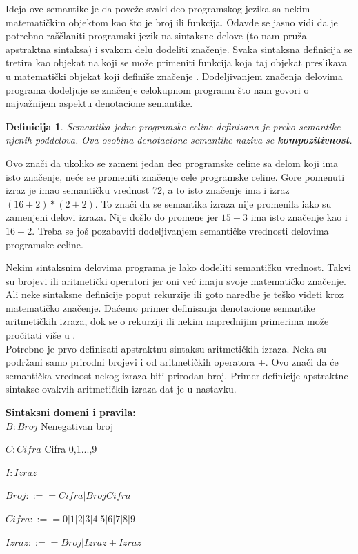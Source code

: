 \documentclass[a4paper]{article}
\newtheorem{definicija}{Definicija}[section]
\begin{document}
Ideja ove semantike je da poveže svaki deo programskog jezika sa nekim matematičkim objektom kao što je broj ili funkcija. Odavde se jasno vidi da je potrebno raščlaniti programski jezik na sintaksne delove (to nam pruža apstraktna sintaksa) i svakom delu dodeliti značenje. Svaka sintaksna definicija se tretira kao objekat na koji se može primeniti funkcija koja taj objekat preslikava u matematički objekat koji definiše značenje \cite{parezanovic}. Dodeljivanjem značenja delovima programa dodeljuje se značenje celokupnom programu što nam govori o najvažnijem aspektu denotacione semantike.
\begin{definicija}
Semantika jedne programske celine definisana je preko semantike njenih poddelova. Ova osobina denotacione semantike naziva se \textbf{kompozitivnost}.
\end{definicija}

Ovo znači da ukoliko se zameni jedan deo programske celine sa delom koji ima isto značenje, neće se promeniti značenje cele programske celine. Gore pomenuti izraz je imao semantičku vrednost 72, a to isto značenje ima i izraz $ (16+2)*(2+2) $. To znači da se semantika izraza nije promenila iako su zamenjeni delovi izraza. Nije došlo do promene jer $ 15+3 $ ima isto značenje kao i $ 16+2 $. Treba se još pozabaviti dodeljivanjem semantičke vrednosti delovima programske celine.

Nekim sintaksnim delovima programa je lako dodeliti semantičku vrednost. Takvi su brojevi ili aritmetički operatori jer oni već imaju svoje matematičko značenje. Ali neke sintaksne definicije poput rekurzije ili goto naredbe je teško videti kroz matematičko značenje. Daćemo primer definisanja denotacione semantike aritmetičkih izraza, dok se o rekurziji ili nekim naprednijim primerima može pročitati više u \cite{nielson}.\\


Potrebno je prvo definisati apstraktnu sintaksu aritmetičkih izraza. Neka su podržani samo prirodni brojevi i od aritmetičkih operatora +. Ovo znači da će semantička vrednost nekog izraza biti prirodan broj. Primer definicije apstraktne sintakse ovakvih aritmetičkih izraza dat je u nastavku.


\begin{tcolorbox}
\textbf{Sintaksni domeni i pravila:}
\\

$B: Broj $  \qquad\qquad Nenegativan broj

$C: Cifra $ \qquad\qquad Cifra 0,1...,9

$I: Izraz $

$ Broj ::== Cifra | Broj Cifra $

$ Cifra ::== 0 | 1 | 2 | 3 | 4 | 5 | 6 | 7 | 8 | 9 $

$ Izraz ::== Broj | Izraz+Izraz $
\end{tcolorbox}
\end{document}
